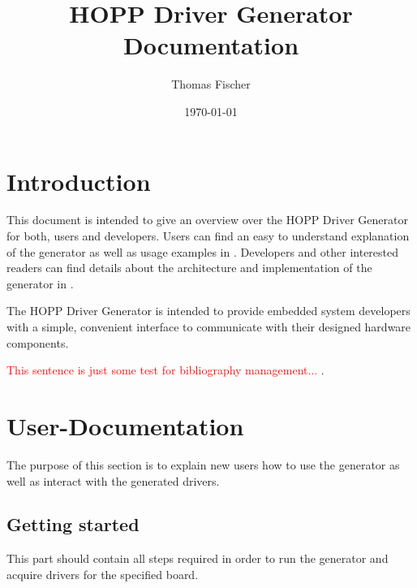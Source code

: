\documentclass{report}
\begin{document}
\title{HOPP Driver Generator Documentation}
\author{Thomas Fischer}
\date{\today}

\maketitle
\thispagestyle{empty}
\newpage

\tableofcontents
\thispagestyle{empty}
\newpage

%
%
%
%
%
%

\chapter{Introduction}
This document is intended to give an overview over the HOPP Driver Generator for both, users and developers. Users can find an easy to understand explanation of the generator as well as usage examples in . Developers and other interested readers can find details about the architecture and implementation of the generator in .

The HOPP Driver Generator is intended to provide embedded system developers %
with a simple, convenient interface to communicate with their designed hardware components. %

\textcolor{red}{This sentence is just some test for bibliography management...} \cite{fischer12}.
\chapter{User-Documentation}
\label{sec:userDoc}
The purpose of this section is to explain new users how to use the generator as well as interact with the generated drivers.

\section{Getting started}
This part should contain all steps required in order to run the generator and acquire drivers for the specified board.
\end{document}
